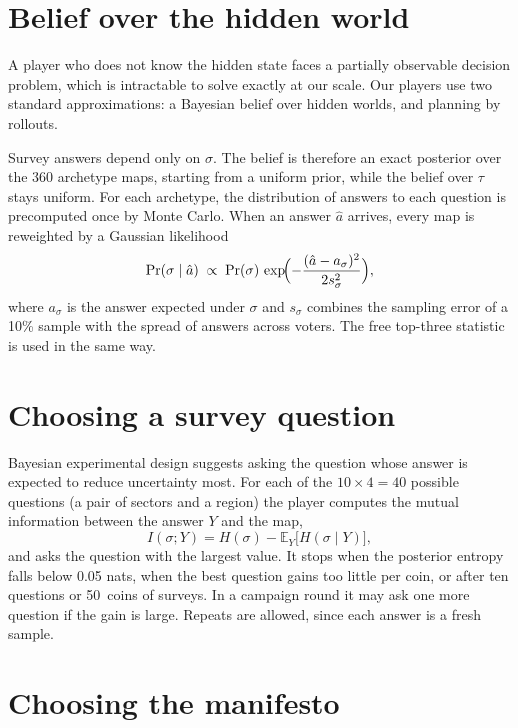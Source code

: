 \documentclass[11pt,a4paper,oneside]{report}
\newcommand{\coins}[1]{#1~coins}
\newcommand{\E}{\mathbb{E}}
\begin{document}
\section{Belief over the hidden world}

A player who does not know the hidden state faces a partially observable decision
problem, which is intractable to solve exactly at our scale. Our players use two
standard approximations: a Bayesian belief over hidden worlds, and planning by rollouts.

Survey answers depend only on $\sigma$. The belief is therefore an exact posterior over the 360
archetype maps, starting from a uniform prior, while the belief over $\tau$ stays uniform. For each archetype, the
distribution of answers to each question is precomputed once by Monte Carlo. When an answer $\hat a$
arrives, every map is reweighted by a Gaussian likelihood
\begin{equation}
  \Pr(\sigma \mid \hat a) \;\propto\; \Pr(\sigma)\,
  \exp\!\Bigl(-\frac{(\hat a - a_\sigma)^2}{2 s^2_\sigma}\Bigr),
\end{equation}
where $a_\sigma$ is the answer expected under $\sigma$ and $s_\sigma$ combines the sampling error of a 10\%
sample with the spread of answers across voters. The free top-three statistic is used in the same way.

\section{Choosing a survey question}

Bayesian experimental design suggests asking the question whose answer is expected to reduce uncertainty
most. For each of the $10 \times 4 = 40$ possible questions (a pair of
sectors and a region) the player computes the mutual information between the answer $Y$ and the map,
\begin{equation}
  I(\sigma; Y) = H(\sigma) - \E_{Y}\bigl[ H(\sigma \mid Y) \bigr],
\end{equation}
and asks the question with the largest value. It stops when the posterior entropy falls below 0.05 nats,
when the best question gains too little per coin, or after ten questions or \coins{50} of surveys. In a
campaign round it may ask one more question if the gain is large. Repeats are allowed, since each answer is
a fresh sample.

\section{Choosing the manifesto}
\end{document}
